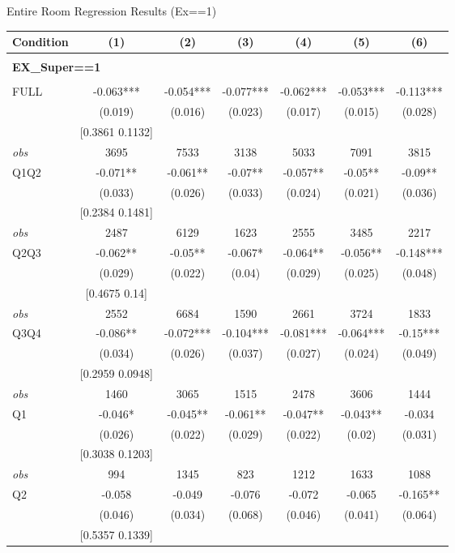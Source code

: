 \begin{table}[]
\TABLE
{Entire Room Regression Results (Ex==1) \label{result_detail1}}{\begin{tabular}{lcccccc}
\hline
Condition & (1) & (2) & (3) & (4) & (5) & (6) \\ \hline
\\ 
\multicolumn{5}{l}{\textbf{EX\_Super==1}} \\ 
\\ 
FULL & -0.063*** & -0.054*** & -0.077*** & -0.062*** & -0.053*** & -0.113*** \\ 
&(0.019)&(0.016) & (0.023)&(0.017)&(0.015)&(0.028)\\ 
& [0.3861 0.1132] & & & & & \\ 
\textit{obs} & 3695 & 7533 & 3138 & 5033 & 7091 & 3815 \\ 
Q1Q2 & -0.071** & -0.061** & -0.07** & -0.057** & -0.05** & -0.09** \\ 
&(0.033)&(0.026) & (0.033)&(0.024)&(0.021)&(0.036)\\ 
& [0.2384 0.1481] & & & & & \\ 
\textit{obs} & 2487 & 6129 & 1623 & 2555 & 3485 & 2217 \\ 
Q2Q3 & -0.062** & -0.05** & -0.067* & -0.064** & -0.056** & -0.148*** \\ 
&(0.029)&(0.022) & (0.04)&(0.029)&(0.025)&(0.048)\\ 
& [0.4675 0.14] & & & & & \\ 
\textit{obs} & 2552 & 6684 & 1590 & 2661 & 3724 & 1833 \\ 
Q3Q4 & -0.086** & -0.072*** & -0.104*** & -0.081*** & -0.064*** & -0.15*** \\ 
&(0.034)&(0.026) & (0.037)&(0.027)&(0.024)&(0.049)\\ 
& [0.2959 0.0948] & & & & & \\ 
\textit{obs} & 1460 & 3065 & 1515 & 2478 & 3606 & 1444 \\ 
Q1 & -0.046* & -0.045** & -0.061** & -0.047** & -0.043** & -0.034 \\ 
&(0.026)&(0.022) & (0.029)&(0.022)&(0.02)&(0.031)\\ 
& [0.3038 0.1203] & & & & & \\ 
\textit{obs} & 994 & 1345 & 823 & 1212 & 1633 & 1088 \\ 
Q2 & -0.058 & -0.049 & -0.076 & -0.072 & -0.065 & -0.165** \\ 
&(0.046)&(0.034) & (0.068)&(0.046)&(0.041)&(0.064)\\ 
& [0.5357 0.1339] & & & & & \\ 

\end{tabular}}
\end{table}
